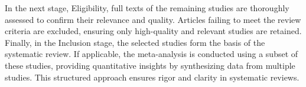 \documentclass[conference]{IEEEtran}
\begin{document}
In the next stage, Eligibility, full texts of the remaining studies are thoroughly assessed to confirm their relevance and quality. Articles failing to meet the review criteria are excluded, ensuring only high-quality and relevant studies are retained. Finally, in the Inclusion stage, the selected studies form the basis of the systematic review. If applicable, the meta-analysis is conducted using a subset of these studies, providing quantitative insights by synthesizing data from multiple studies. This structured approach ensures rigor and clarity in systematic reviews.



\end{document}
